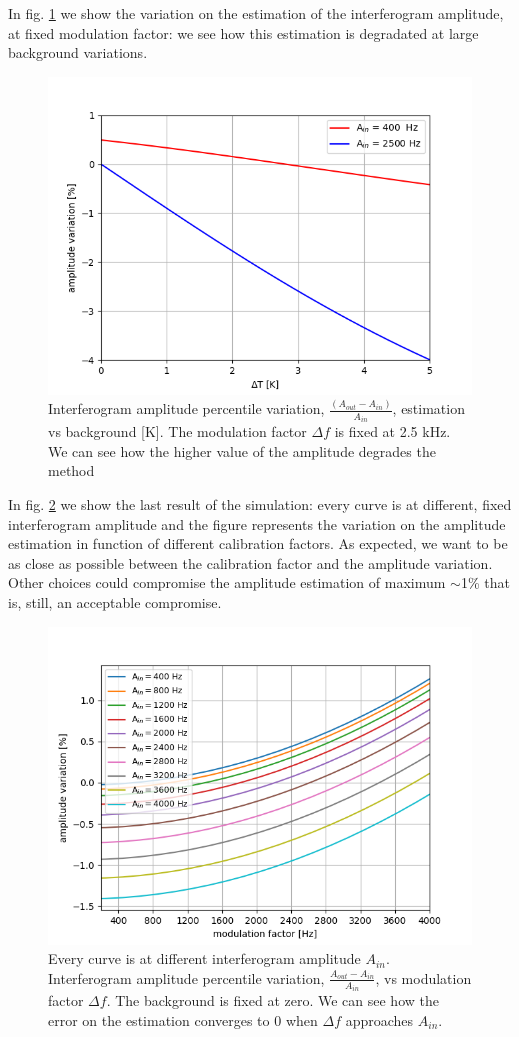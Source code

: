 \noindent In fig. \ref{fig:amp_bck} we show the variation on the estimation of the interferogram amplitude, at fixed modulation factor: we see how this estimation is degradated at large background variations.

\begin{figure}[htf]
	\centering
	\includegraphics[width=.5\textwidth]{3.acqui/amplitude_variation.png}
	\caption{Interferogram amplitude percentile variation, $\frac{(A_{out}-A_{in})}{A_{in}}$, estimation vs background [K]. The modulation factor $\Delta f$ is fixed at 2.5 kHz. We can see how the higher value of the amplitude degrades the method}
	\label{fig:amp_bck}
\end{figure}

\noindent In fig. \ref{fig:amp_mod} we show the last result of the simulation: every curve is at different, fixed interferogram amplitude and the figure represents the variation on the amplitude estimation in function of different calibration factors. As expected, we want to be as close as possible between the calibration factor and the amplitude variation. Other choices could compromise the amplitude estimation of maximum $\sim$1\% that is, still, an acceptable compromise.

\begin{figure}[htf]
	\centering
	\includegraphics[width=.5\textwidth]{3.acqui/several_modulations.png}
		\caption{Every curve is at different interferogram amplitude $A_{in}$. Interferogram amplitude percentile variation, $\frac{A_{out}-A_{in}}{A_{in}}$, vs modulation factor $\Delta f$.  The background is fixed at zero. We can see how the error on the estimation converges to 0 when $\Delta f$ approaches $A_{in}$. }
	\label{fig:amp_mod}
\end{figure}

